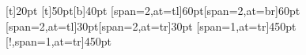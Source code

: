 \documentclass{article}
\begin{document}
[t]{20pt}
[t]{50pt}[b]{40pt}
[span=2,at=tl]{60pt}[span=2,at=br]{60pt}
[span=2,at=tl]{30pt}[span=2,at=tr]{30pt}
[span=1,at=tr]{450pt}
\clearpage
[!,span=1,at=tr]{450pt}
\clearpage
\end{document}
